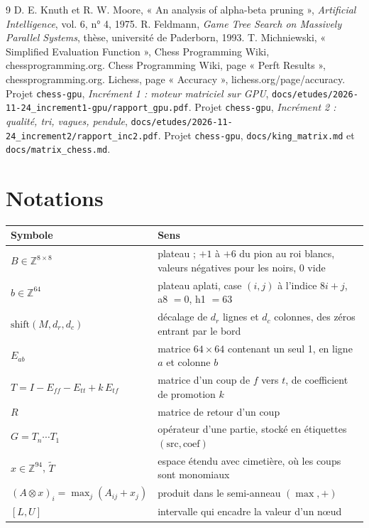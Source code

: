 \documentclass[11pt,a4paper]{article}
\newcommand{\code}[1]{\texttt{#1}}
\newcommand{\shift}{\mathrm{shift}}
\theoremstyle{plain}
\begin{document}
\begin{thebibliography}{9}
 D. E. Knuth et R. W. Moore, « An analysis of alpha-beta pruning »,
\emph{Artificial Intelligence}, vol. 6, n° 4, 1975.
 R. Feldmann, \emph{Game Tree Search on Massively Parallel Systems}, thèse,
université de Paderborn, 1993.
 T. Michniewski, « Simplified Evaluation Function », Chess Programming Wiki,
chessprogramming.org.
 Chess Programming Wiki, page « Perft Results », chessprogramming.org.
 Lichess, page « Accuracy », lichess.org/page/accuracy.
 Projet \code{chess-gpu}, \emph{Incrément 1 : moteur matriciel sur GPU},
\code{docs/etudes/2026-11-24\_increment1-gpu/rapport\_gpu.pdf}.
 Projet \code{chess-gpu}, \emph{Incrément 2 : qualité, tri, vagues, pendule},
\code{docs/etudes/2026-11-24\_increment2/rapport\_inc2.pdf}.
 Projet \code{chess-gpu}, \code{docs/king\_matrix.md} et
\code{docs/matrix\_chess.md}.
\end{thebibliography}

\appendix
\section{Notations}
\begin{table}[H]
\centering\small
\begin{tabular}{l>{\raggedright\arraybackslash}p{8.6cm}}
\toprule
Symbole & Sens\\
\midrule
$B\in\mathbb{Z}^{8\times8}$ & plateau ; $+1$ à $+6$ du pion au roi blancs, valeurs négatives pour les noirs, 0 vide\\
$b\in\mathbb{Z}^{64}$ & plateau aplati, case $(i,j)$ à l'indice $8i+j$, a8 $=0$, h1 $=63$\\
$\shift(M, d_r, d_c)$ & décalage de $d_r$ lignes et $d_c$ colonnes, des zéros entrant par le bord\\
$E_{ab}$ & matrice $64\times64$ contenant un seul 1, en ligne $a$ et colonne $b$\\
$T = I - E_{ff} - E_{tt} + k\,E_{tf}$ & matrice d'un coup de $f$ vers $t$, de coefficient de promotion $k$\\
$R$ & matrice de retour d'un coup\\
$G = T_n\cdots T_1$ & opérateur d'une partie, stocké en étiquettes $(\mathrm{src}, \mathrm{coef})$\\
$x\in\mathbb{Z}^{94}$, $\tilde T$ & espace étendu avec cimetière, où les coups sont monomiaux\\
$(A\otimes x)_i = \max_j(A_{ij}+x_j)$ & produit dans le semi-anneau $(\max, +)$\\
$[L, U]$ & intervalle qui encadre la valeur d'un nœud\\
\bottomrule
\end{tabular}
\end{table}
\end{document}
